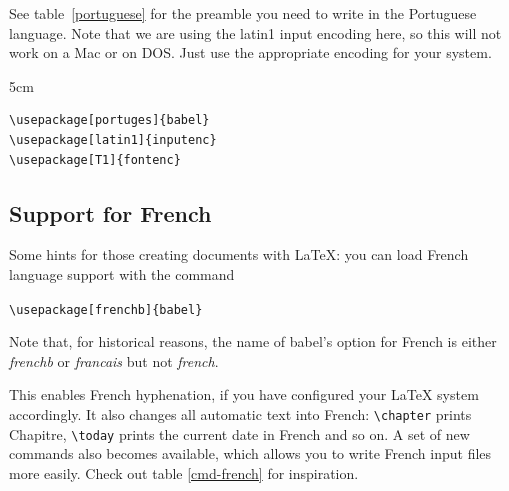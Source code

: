 See table~\ref{portuguese} for the preamble you need to write in the
Portuguese language. Note that we are using the latin1 input encoding here,
so this will not work on a Mac or on DOS. Just use
the appropriate encoding for your system.

\begin{table}[btp]
\caption{Preamble forPortuguese documents.} \label{portuguese}
\begin{lined}{5cm}
\begin{verbatim}
\usepackage[portuges]{babel}
\usepackage[latin1]{inputenc}
\usepackage[T1]{fontenc}
\end{verbatim}
\bigskip
\end{lined}
\end{table}


\subsection{Support for French}

Some hints for those creating  documents with \LaTeX{}:
you can load French language support with the command

\begin{lscommand}
\verb|\usepackage[frenchb]{babel}|
\end{lscommand}

Note that, for historical reasons, the name of \textsf{babel}'s option 
for French is either \emph{frenchb} or \emph{francais} but not \emph{french}.

This enables French hyphenation, if you have configured your
LaTeX system accordingly. It also changes all automatic text into
French: \verb+\chapter+ prints Chapitre, \verb+\today+ prints the current
date in French and so on. A set of new commands also
becomes available, which allows you to write French input files more
easily. Check out table \ref{cmd-french} for inspiration. 

